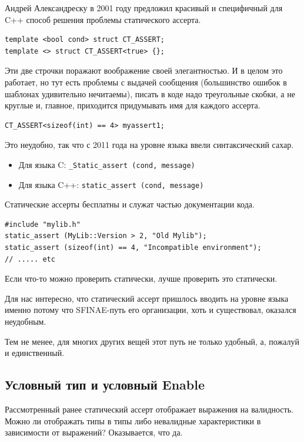 \documentclass[a4paper,12pt,oneside]{book}
\begin{document}
Андрей Александреску \cite{mcpp} в 2001 году предложил красивый и специфичный для C++ способ решения проблемы статического ассерта.

\begin{lstlisting}
template <bool cond> struct CT_ASSERT;
template <> struct CT_ASSERT<true> {};
\end{lstlisting}

Эти две строчки поражают воображение своей элегантностью. И в целом это работает, но тут есть проблемы с выдачей сообщения (большинство ошибок в шаблонах удивительно нечитаемы), писать в коде надо треугольные скобки, а не круглые и, главное, приходится придумывать имя для каждого ассерта.

\begin{lstlisting}
CT_ASSERT<sizeof(int) == 4> myassert1; 
\end{lstlisting}

Это неудобно, так что с 2011 года на уровне языка ввели синтаксический сахар.

\begin{itemize}
\item Для языка C: \lstinline!_Static_assert (cond, message)!
\item Для языка C++: \lstinline!static_assert (cond, message)!
\end{itemize}

Статические ассерты бесплатны и служат частью документации кода.

\begin{lstlisting}
#include "mylib.h"
static_assert (MyLib::Version > 2, "Old Mylib");
static_assert (sizeof(int) == 4, "Incompatible environment");
// ..... etc
\end{lstlisting}

Если что-то можно проверить статически, лучше проверить это статически.

Для нас интересно, что статический ассерт пришлось вводить на уровне языка именно потому что SFINAE-путь его организации, хоть и существовал, оказался неудобным.

Тем не менее, для многих других вещей этот путь не только удобный, а, пожалуй и единственный.

\subsection{Условный тип и условный Enable}

Рассмотренный ранее статический ассерт отображает выражения на валидность. Можно ли отображать типы в типы либо невалидные характеристики в зависимости от выражений? Оказывается, что да.
\end{document}
